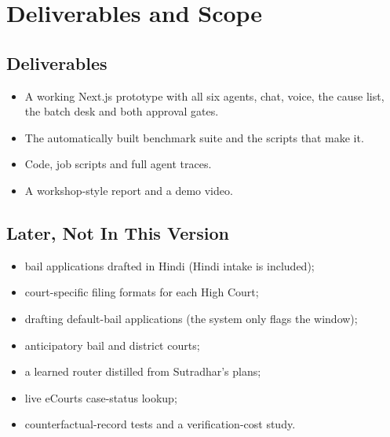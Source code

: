 \documentclass[10pt,a4paper]{article}
\begin{document}
\section{Deliverables and Scope}

\subsection{Deliverables}

\begin{itemize}
\item A working Next.js prototype with all six agents, chat, voice, the cause list, the batch desk and both approval gates.
\item The automatically built benchmark suite and the scripts that make it.
\item Code, job scripts and full agent traces.
\item A workshop-style report and a demo video.
\end{itemize}

\subsection{Later, Not In This Version}

\begin{itemize}
\item bail applications drafted in Hindi (Hindi intake is included);
\item court-specific filing formats for each High Court;
\item drafting default-bail applications (the system only flags the window);
\item anticipatory bail and district courts;
\item a learned router distilled from Sutradhar's plans;
\item live eCourts case-status lookup;
\item counterfactual-record tests and a verification-cost study.
\end{itemize}

\clearpage
\end{document}
